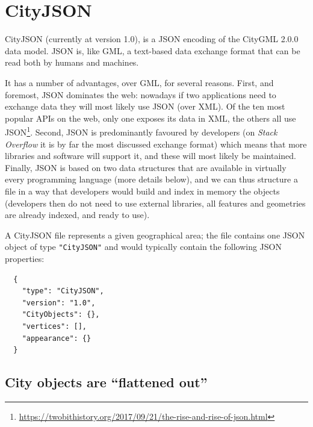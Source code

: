 \section{CityJSON}%

CityJSON (currently at version 1.0), is a JSON encoding of the CityGML 2.0.0 data model.
JSON is, like GML, a text-based data exchange format that can be read both by humans and machines.

It has a number of advantages, over GML, for several reasons.
First, and foremost, JSON dominates the web: nowadays if two applications need to exchange data they will most likely use JSON (over XML).
Of the ten most popular APIs on the web, only one exposes its data in XML, the others all use JSON\footnote{\url{https://twobithistory.org/2017/09/21/the-rise-and-rise-of-json.html}}.
Second, JSON is predominantly favoured by developers (on \emph{Stack Overflow} it is by far the most discussed exchange format) which means that more libraries and software will support it, and these will most likely be maintained.
Finally, JSON is based on two data structures that are available in virtually every programming language (more details below), and we can thus structure a file in a way that  developers would build and index in memory the objects (developers then do not need to use external libraries, all features and geometries are already indexed, and ready to use). 

%

A CityJSON file represents a given geographical area; the file contains one JSON object of type \texttt{"CityJSON"} and would typically contain the following JSON properties:
\begin{lstlisting}
  {
    "type": "CityJSON",
    "version": "1.0",
    "CityObjects": {},
    "vertices": [],
    "appearance": {}
  }
\end{lstlisting}


\subsection{City objects are ``flattened out''}

